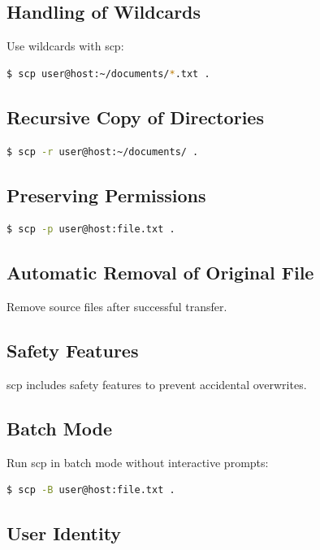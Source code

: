 \documentclass[12pt]{book}
\begin{document}
\subsection{Handling of Wildcards}

Use wildcards with scp:

\begin{lstlisting}[language=bash]
$ scp user@host:~/documents/*.txt .
\end{lstlisting}

\subsection{Recursive Copy of Directories}

\begin{lstlisting}[language=bash]
$ scp -r user@host:~/documents/ .
\end{lstlisting}

\subsection{Preserving Permissions}

\begin{lstlisting}[language=bash]
$ scp -p user@host:file.txt .
\end{lstlisting}

\subsection{Automatic Removal of Original File}

Remove source files after successful transfer.

\subsection{Safety Features}

scp includes safety features to prevent accidental overwrites.

\subsection{Batch Mode}

Run scp in batch mode without interactive prompts:

\begin{lstlisting}[language=bash]
$ scp -B user@host:file.txt .
\end{lstlisting}

\subsection{User Identity}
\end{document}
